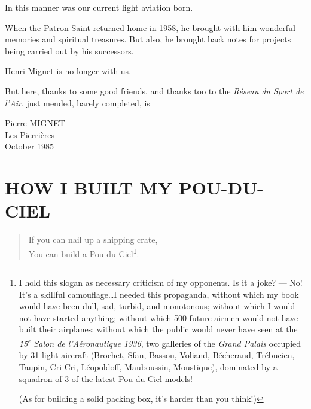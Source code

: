 \documentclass{book}
\begin{document}
In this manner was our current light aviation born.

When the Patron Saint returned home in 1958, he brought with him
wonderful memories and spiritual treasures.  But also, he brought back
notes for projects being carried out by his successors.

Henri Mignet is no longer with us.

\begin{samepage}
  
But here, thanks to some good friends, and thanks too to the
\textit{R\'eseau du Sport de l'Air}, just mended, barely completed, is


\begin{flushright}
  Pierre MIGNET\\Les Pierri\`eres\\October 1985
\end{flushright}

\end{samepage}

\chapter{HOW I BUILT MY POU-DU-CIEL}

\begin{verse}
  { \selectfont If you can nail up a shipping
    crate,\\ You can build a Pou-du-Ciel\footnote{I hold this slogan
      as necessary criticism of my opponents. Is it a joke? --- No!
      It's a skillful camouflage\ldots I needed this propaganda,
      without which my book would have been dull, sad, turbid, and
      monotonous; without which I would not have started anything;
      without which 500 future airmen would not have built their
      airplanes; without which the public would never have seen at the
      \textit{15\textsuperscript{e} Salon de l'A\'eronautique 1936},
      two galleries of the \textit{Grand Palais} occupied by 31 light
      aircraft (Brochet, Sfan, Bassou, Voliand, B\'echeraud,
      Tr\'ebucien, Taupin, Cri-Cri, L\'eopoldoff, Mauboussin,
      Moustique), dominated by a squadron of 3 of the latest
      Pou-du-Ciel models!
      
      (As for building a solid packing box, it's harder than you
      think!)}.
    
}
\end{verse}
\end{document}
